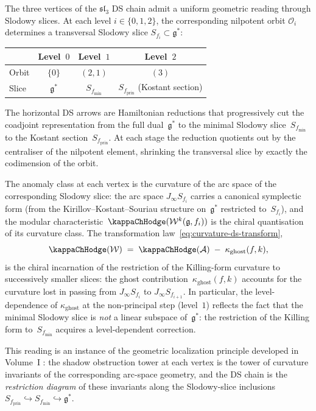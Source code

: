 \begin{remark}
\label{rem:ds-chain-geometric-reading}
The three vertices of the $\mathfrak{sl}_3$ DS chain admit a
uniform geometric reading through Slodowy slices. At each level
$i\in\{0,1,2\}$, the corresponding nilpotent orbit $\mathcal O_i$
determines a transversal Slodowy slice
$S_{f_i}\subset\mathfrak{g}^*$:
\begin{center}
\renewcommand{\arraystretch}{1.3}
\begin{tabular}{lccc}
& \textbf{Level~$0$} & \textbf{Level~$1$} & \textbf{Level~$2$} \\
\hline
Orbit & $\{0\}$ & $(2,1)$ & $(3)$ \\[2pt]
Slice & $\mathfrak{g}^*$ & $S_{f_{\min}}$ & $S_{f_{\mathrm{prin}}}$
 (Kostant section)
\end{tabular}
\end{center}
The horizontal DS arrows are Hamiltonian reductions that
progressively cut the coadjoint representation from the full
dual~$\mathfrak{g}^*$ to the minimal Slodowy
slice~$S_{f_{\min}}$ to the Kostant
section~$S_{f_{\mathrm{prin}}}$. At each stage the reduction
quotients out by the centraliser of the nilpotent element,
shrinking the transversal slice by exactly the codimension of the
orbit.

The anomaly class at each vertex is the curvature of the arc
space of the corresponding Slodowy slice: the arc space
$J_\infty S_{f_i}$ carries a canonical symplectic form (from
the Kirillov--Kostant--Souriau structure on~$\mathfrak{g}^*$
restricted to~$S_{f_i}$), and the modular
characteristic~$\kappaChHodge(\mathcal W^k(\mathfrak{g},f_i))$ is
the chiral quantisation of its curvature class. The
transformation law~\eqref{eq:curvature-ds-transform},
\[
\kappaChHodge(\mathcal W)
\;=\;
\kappaChHodge(\mathcal A)
\;-\;
\kappa_{\mathrm{ghost}}(f,k),
\]
is the chiral incarnation of the restriction of the
Killing-form curvature to successively smaller slices: the ghost
contribution~$\kappa_{\mathrm{ghost}}(f,k)$ accounts for the
curvature lost in passing from $J_\infty S_{f_i}$ to
$J_\infty S_{f_{i+1}}$. In particular, the level-dependence of
$\kappa_{\mathrm{ghost}}$ at the non-principal step (level~$1$)
reflects the fact that the minimal Slodowy slice is \emph{not} a
linear subspace of~$\mathfrak{g}^*$: the restriction of the
Killing form to~$S_{f_{\min}}$ acquires a level-dependent
correction.

This reading is an instance of the geometric localization
principle developed in Volume~I
: the
shadow obstruction tower at each vertex is the tower of curvature invariants
of the corresponding arc-space geometry, and the DS chain is the
\emph{restriction diagram} of these invariants along the
Slodowy-slice inclusions
$S_{f_{\mathrm{prin}}}\hookrightarrow
S_{f_{\min}}\hookrightarrow\mathfrak{g}^*$.
\end{remark}

